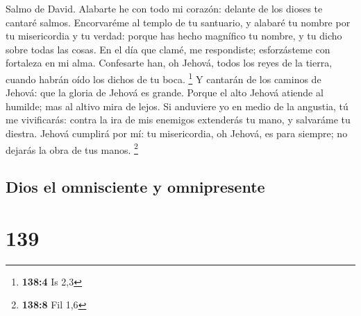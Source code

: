  Salmo de David. Alabarte he con todo mi corazón: delante de
los dioses te cantaré salmos.  Encorvaréme al templo de tu
santuario, y alabaré tu nombre por tu misericordia y tu verdad: porque
has hecho magnífico tu nombre, y tu dicho sobre todas las cosas.
 En el día que clamé, me respondiste; esforzásteme con
fortaleza en mi alma.  Confesarte han, oh Jehová, todos los
reyes de la tierra, cuando habrán oído los dichos de tu boca.
\footnote{\textbf{138:4} Is 2,3}  Y cantarán de los caminos
de Jehová: que la gloria de Jehová es grande.  Porque el
alto Jehová atiende al humilde; mas al altivo mira de lejos.
 Si anduviere yo en medio de la angustia, tú me vivificarás:
contra la ira de mis enemigos extenderás tu mano, y salvaráme tu
diestra.  Jehová cumplirá por mí: tu misericordia, oh
Jehová, es para siempre; no dejarás la obra de tus manos. \footnote{\textbf{138:8}
  Fil 1,6}

\hypertarget{dios-el-omnisciente-y-omnipresente}{%
\subsection{Dios el omnisciente y
omnipresente}\label{dios-el-omnisciente-y-omnipresente}}

\hypertarget{section-138}{%
\section{139}\label{section-138}}

